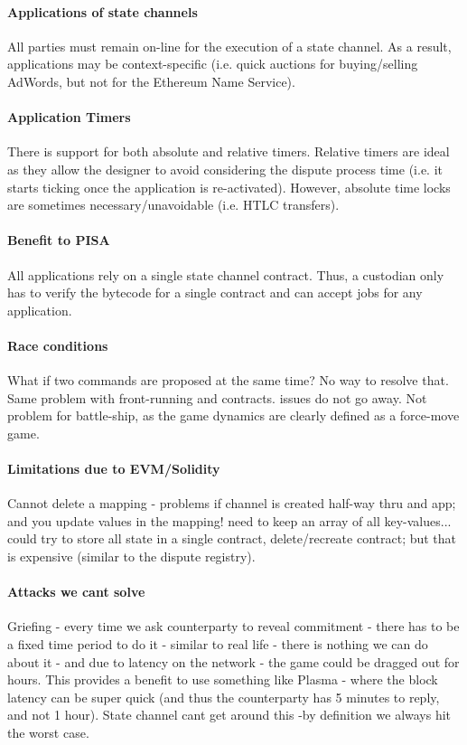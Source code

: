 \documentclass{llncs}
\begin{document}
\paragraph{Applications of state channels} All parties must remain on-line for the execution of a state channel. As a result, applications may be context-specific (i.e. quick auctions for buying/selling AdWords, but not for the Ethereum Name Service). 

\paragraph{Application Timers} There is support for both absolute and relative timers. Relative timers are ideal as they allow the designer to avoid considering the dispute process time (i.e. it starts ticking once the application is re-activated). However, absolute time locks are sometimes necessary/unavoidable (i.e. HTLC transfers). 

\paragraph{Benefit to PISA} All applications rely on a single state channel contract. Thus, a custodian only has to verify the bytecode for a single contract and can accept jobs for any application. 

\paragraph{Race conditions} What if two commands are proposed at the same time? No way to resolve that. Same problem with front-running and contracts. issues do not go away. Not problem for battle-ship, as the game dynamics are clearly defined as a force-move game. 

\paragraph{Limitations due to EVM/Solidity} Cannot delete a mapping - problems if channel is created half-way thru and app; and you update values in the mapping! need to keep an array of all key-values... could try to store all state in a single contract, delete/recreate contract; but that is expensive (similar to the dispute registry).  


\paragraph{Attacks we cant solve} Griefing - every time we ask counterparty to reveal commitment - there has to be a fixed time period to do it - similar to real life - there is nothing we can do about it - and due to latency on the network - the game could be dragged out for hours. This provides a benefit to use something like Plasma - where the block latency can be super quick (and thus the counterparty has 5 minutes to reply, and not 1 hour). State channel cant get around this -by definition we always hit the worst case. 
 
\end{document}
